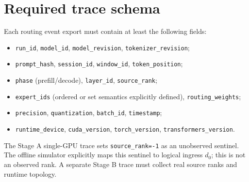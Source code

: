\documentclass[a4paper,preprint,review,12pt,authoryear]{elsarticle}
\begin{document}
\section{Required trace schema}
\label{app:schema}

Each routing event export must contain at least the following fields:
\begin{itemize}[leftmargin=*]
 \item \texttt{run\_id}, \texttt{model\_id}, \texttt{model\_revision}, \texttt{tokenizer\_revision};
 \item \texttt{prompt\_hash}, \texttt{session\_id}, \texttt{window\_id}, \texttt{token\_position};
 \item \texttt{phase} (prefill/decode), \texttt{layer\_id}, \texttt{source\_rank};
 \item \texttt{expert\_ids} (ordered or set semantics explicitly defined), \texttt{routing\_weights};
 \item \texttt{precision}, \texttt{quantization}, \texttt{batch\_id}, \texttt{timestamp};
 \item \texttt{runtime\_device}, \texttt{cuda\_version}, \texttt{torch\_version}, \texttt{transformers\_version}.
\end{itemize}
The Stage A single-GPU trace sets \texttt{source\_rank=-1} as an unobserved sentinel. The offline simulator explicitly maps this sentinel to logical ingress $d_0$; this is not an observed rank. A separate Stage B trace must collect real source ranks and runtime topology.
\end{document}
